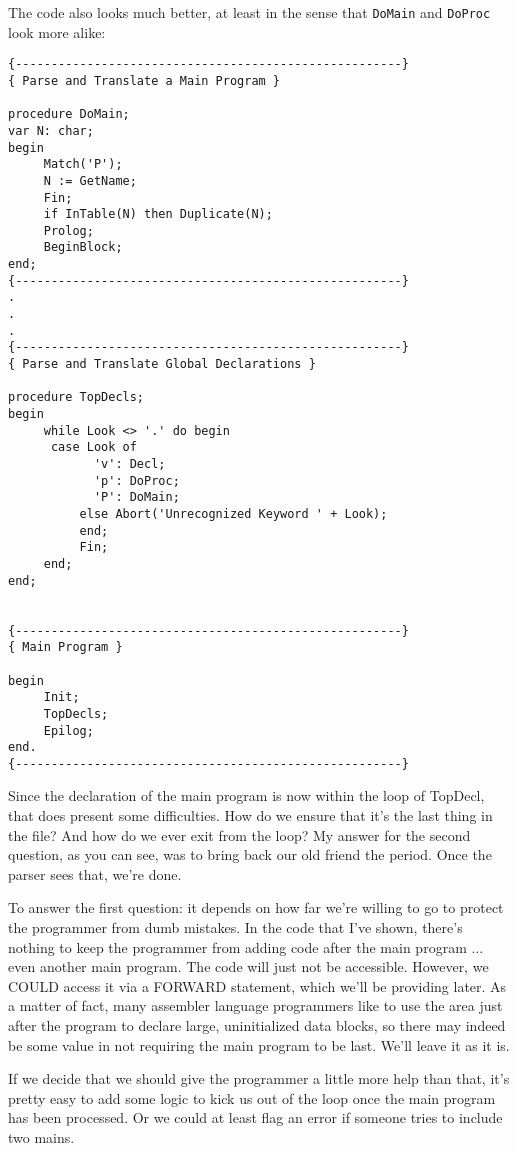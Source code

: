 The code  also  looks  much  better, at  least in the sense that {\tt DoMain} and {\tt DoProc} look more alike:

\begin{verbatim}
{------------------------------------------------------}
{ Parse and Translate a Main Program }

procedure DoMain;
var N: char;
begin
     Match('P');
     N := GetName;
     Fin;
     if InTable(N) then Duplicate(N);
     Prolog;
     BeginBlock;
end;
{------------------------------------------------------}
.
.
.
{------------------------------------------------------}
{ Parse and Translate Global Declarations }

procedure TopDecls;
begin
     while Look <> '.' do begin
      case Look of
            'v': Decl;
            'p': DoProc;
            'P': DoMain;
          else Abort('Unrecognized Keyword ' + Look);
          end;
          Fin;
     end;
end;


{------------------------------------------------------}
{ Main Program }

begin
     Init;
     TopDecls;
     Epilog;
end.
{------------------------------------------------------}
\end{verbatim}

Since the declaration of the main program is now within  the loop of  TopDecl, that  does  present  some difficulties. How do  we ensure that it's  the last thing in the file?  And how do we ever exit  from  the  loop?  My answer for the second question, as you can see, was to bring back our old friend the  period. Once the parser sees that, we're done.

To  answer  the first question:  it  depends  on  how  far  we're willing to go to  protect  the programmer from dumb mistakes. In the code that I've shown, there's nothing to keep the programmer from adding code after  the  main  program  ... even another main program. The code will just not be  accessible. However, we COULD access it via a FORWARD statement, which we'll be providing later. As a  matter  of fact, many assembler language programmers like to use  the  area  just  after the program to declare large, uninitialized data blocks, so there may indeed be  some  value in not  requiring the main program to be last. We'll leave it as it is.

If we decide  that  we  should  give the programmer a little more help than that, it's pretty easy to add some logic to kick us out of the loop  once  the  main  program  has been processed. Or we could  at least flag an error if someone  tries  to  include  two mains.

